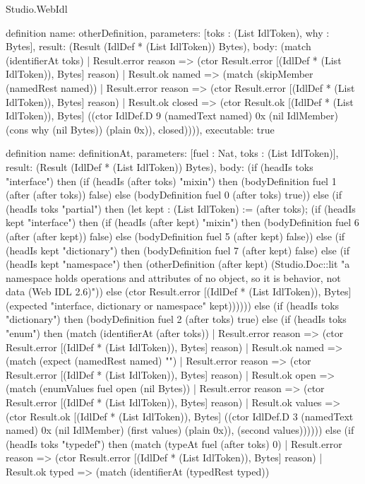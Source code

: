 \begin{lexlean}{Studio.WebIdl}
\begin{semanticmodule}
{definition{
  name: otherDefinition,
  parameters: [toks : (List IdlToken), why : Bytes],
  result: (Result (IdlDef * (List IdlToken)) Bytes),
  body: (match (identifierAt toks)
    | Result.error reason => (ctor Result.error [(IdlDef * (List IdlToken)), Bytes] reason)
    | Result.ok named => (match (skipMember (namedRest named))
    | Result.error reason => (ctor Result.error [(IdlDef * (List IdlToken)), Bytes] reason)
    | Result.ok closed => (ctor Result.ok [(IdlDef * (List IdlToken)), Bytes] ((ctor IdlDef.D 9 (namedText named) 0x (nil IdlMember) (cons why (nil Bytes)) (plain 0x)), closed)))),
  executable: true
}

definition{
  name: definitionAt,
  parameters: [fuel : Nat, toks : (List IdlToken)],
  result: (Result (IdlDef * (List IdlToken)) Bytes),
  body: (if (headIs toks "interface") then (if (headIs (after toks) "mixin") then (bodyDefinition fuel 1 (after (after toks)) false) else (bodyDefinition fuel 0 (after toks) true)) else (if (headIs toks "partial") then (let kept : (List IdlToken) := (after toks); (if (headIs kept "interface") then (if (headIs (after kept) "mixin") then (bodyDefinition fuel 6 (after (after kept)) false) else (bodyDefinition fuel 5 (after kept) false)) else (if (headIs kept "dictionary") then (bodyDefinition fuel 7 (after kept) false) else (if (headIs kept "namespace") then (otherDefinition (after kept) (Studio.Doc::lit "a namespace holds operations and attributes of no object, so it is behavior, not data (Web IDL 2.6)")) else (ctor Result.error [(IdlDef * (List IdlToken)), Bytes] (expected "interface, dictionary or namespace" kept)))))) else (if (headIs toks "dictionary") then (bodyDefinition fuel 2 (after toks) true) else (if (headIs toks "enum") then (match (identifierAt (after toks))
    | Result.error reason => (ctor Result.error [(IdlDef * (List IdlToken)), Bytes] reason)
    | Result.ok named => (match (expect (namedRest named) "{")
    | Result.error reason => (ctor Result.error [(IdlDef * (List IdlToken)), Bytes] reason)
    | Result.ok open => (match (enumValues fuel open (nil Bytes))
    | Result.error reason => (ctor Result.error [(IdlDef * (List IdlToken)), Bytes] reason)
    | Result.ok values => (ctor Result.ok [(IdlDef * (List IdlToken)), Bytes] ((ctor IdlDef.D 3 (namedText named) 0x (nil IdlMember) (first values) (plain 0x)), (second values)))))) else (if (headIs toks "typedef") then (match (typeAt fuel (after toks) 0)
    | Result.error reason => (ctor Result.error [(IdlDef * (List IdlToken)), Bytes] reason)
    | Result.ok typed => (match (identifierAt (typedRest typed))
}}}
\end{semanticmodule}
\end{lexlean}
